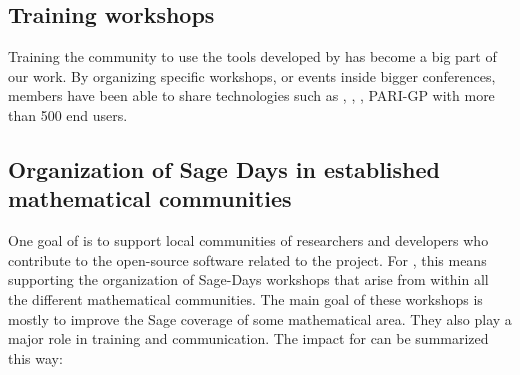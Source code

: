 \documentclass{deliverablereport}
\begin{document}
\subsection{Training workshops}

Training the community to use the tools developed by \ODK has become a big 
part of our work. By organizing specific workshops, or events inside bigger
conferences, \ODK members have been able to share \ODK technologies such as \Jupyter,
\Sage, \GAP, PARI-GP with more than 500 end users.





























\subsection{Organization of Sage Days in established mathematical communities}

One goal of \ODK is to support local communities of researchers
and developers who contribute to the open-source software related to
the project. For \Sage, this means supporting the organization of Sage-Days
workshops that arise from within all the different mathematical communities. The main 
goal of these workshops is mostly to improve the Sage coverage of some mathematical
area. They also play a major role in training and communication. The
impact for \ODK can be summarized this way:
\end{document}
